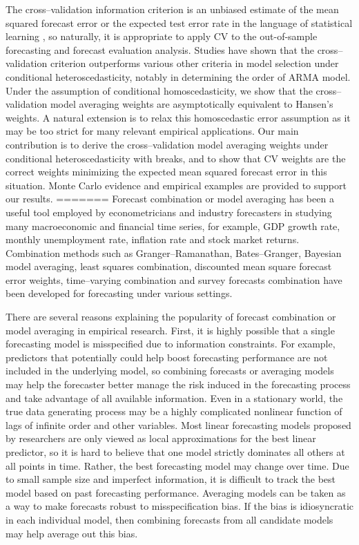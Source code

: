 The cross--validation information criterion is an unbiased estimate of the mean squared forecast error or the expected test error rate in the language of statistical learning \cite{elements_statistical_learning}, so naturally, it is appropriate to apply CV to the out-of-sample forecasting and forecast evaluation analysis. Studies have shown that the cross--validation criterion outperforms various other criteria in model selection under conditional heteroscedasticity, notably in determining the order of ARMA model. Under the assumption of conditional homoscedasticity, we show that the cross--validation model averaging weights are asymptotically equivalent to Hansen's weights. A natural extension is to relax this homoscedastic error assumption as it may be too strict for many relevant empirical applications. Our main contribution is to derive the cross--validation model averaging weights under conditional heteroscedasticity with breaks, and to show that CV weights are the correct weights minimizing the expected mean squared forecast error in this situation. Monte Carlo evidence and empirical examples are provided to support our results.
=======
Forecast combination or model averaging has been a useful tool employed by econometricians and industry forecasters in studying many macroeconomic and financial time series, for example, GDP growth rate, monthly unemployment rate, inflation rate and stock market returns. Combination methods such as Granger--Ramanathan, Bates--Granger, Bayesian model averaging, least squares combination, discounted mean square forecast error weights, time--varying combination and survey forecasts combination have been developed for forecasting under various settings. 

There are several reasons explaining the popularity of forecast combination or model averaging in empirical research. First, it is highly possible that a single forecasting model is misspecified due to information constraints. For example, predictors that potentially could help boost forecasting performance are not included in the underlying model, so combining forecasts or averaging models may help the forecaster better manage the risk induced in the forecasting process and take advantage of all available information. Even in a stationary world, the true data generating process may be a highly complicated nonlinear function of lags of infinite order and other variables. Most linear forecasting models proposed by researchers are only viewed as local approximations for the best linear predictor, so it is hard to believe that one model strictly dominates all others at all points in time. Rather, the best forecasting model may change over time. Due to small sample size and imperfect information, it is difficult to track the best model based on past forecasting performance. Averaging models can be taken as a way to make forecasts robust to misspecification bias. If the bias is idiosyncratic in each individual model, then combining forecasts from all candidate models may help average out this bias. 

